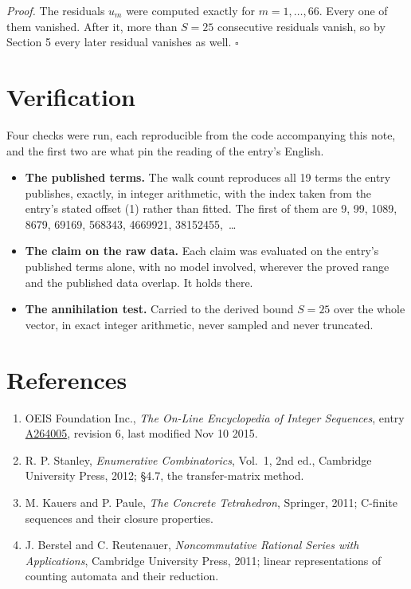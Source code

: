 \documentclass[11pt]{article}
\theoremstyle{definition}
\begin{document}
{\itshape Proof.} The residuals $u_m$ were computed exactly for $m = 1,\dots,66$. Every one of them vanished. After it, more than $S = 25$ consecutive residuals vanish, so by Section 5 every later residual vanishes as well. $\square$

\section{Verification}

Four checks were run, each reproducible from the code accompanying this note, and the first two are what pin the reading of the entry's English.

\begin{itemize}

\item {\bfseries The published terms.} The walk count reproduces all 19 terms the entry publishes, exactly, in integer arithmetic, with the index taken from the entry's stated offset (1) rather than fitted. The first of them are 9, 99, 1089, 8679, 69169, 568343, 4669921, 38152455,~\dots

\item {\bfseries The claim on the raw data.} Each claim was evaluated on the entry's published terms alone, with no model involved, wherever the proved range and the published data overlap. It holds there.

\item {\bfseries The annihilation test.} Carried to the derived bound $S = 25$ over the whole vector, in exact integer arithmetic, never sampled and never truncated.

\end{itemize}

\section{References}

\begin{enumerate}

\item OEIS Foundation Inc., \emph{The On-Line Encyclopedia of Integer Sequences}, entry \href{https://oeis.org/A264005}{A264005}, revision 6, last modified Nov 10 2015.

\item R. P. Stanley, \emph{Enumerative Combinatorics}, Vol.~1, 2nd ed., Cambridge University Press, 2012; \S4.7, the transfer-matrix method.

\item M. Kauers and P. Paule, \emph{The Concrete Tetrahedron}, Springer, 2011; C-finite sequences and their closure properties.

\item J. Berstel and C. Reutenauer, \emph{Noncommutative Rational Series with Applications}, Cambridge University Press, 2011; linear representations of counting automata and their reduction.

\end{enumerate}
\end{document}
